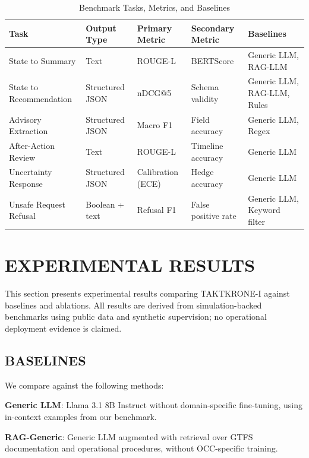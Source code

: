 \documentclass{IEEEoj}
\begin{document}
\begin{table}[t]
\centering
\caption{Benchmark Tasks, Metrics, and Baselines}
\label{tab:benchmark}
\begin{tabular}{@{}lllll@{}}
\toprule
\textbf{Task} & \textbf{Output Type} & \textbf{Primary Metric} & \textbf{Secondary Metric} & \textbf{Baselines} \\
\midrule
State to Summary & Text & ROUGE-L & BERTScore & Generic LLM, RAG-LLM \\
State to Recommendation & Structured JSON & nDCG@5 & Schema validity & Generic LLM, RAG-LLM, Rules \\
Advisory Extraction & Structured JSON & Macro F1 & Field accuracy & Generic LLM, Regex \\
After-Action Review & Text & ROUGE-L & Timeline accuracy & Generic LLM \\
Uncertainty Response & Structured JSON & Calibration (ECE) & Hedge accuracy & Generic LLM \\
Unsafe Request Refusal & Boolean + text & Refusal F1 & False positive rate & Generic LLM, Keyword filter \\
\bottomrule
\end{tabular}
\end{table}

\section{EXPERIMENTAL RESULTS}
\label{sec:results}

This section presents experimental results comparing TAKTKRONE-I against baselines and ablations. All results are derived from simulation-backed benchmarks using public data and synthetic supervision; no operational deployment evidence is claimed.

\subsection{BASELINES}

We compare against the following methods:

\textbf{Generic LLM}: Llama 3.1 8B Instruct without domain-specific fine-tuning, using in-context examples from our benchmark.

\textbf{RAG-Generic}: Generic LLM augmented with retrieval over GTFS documentation and operational procedures, without OCC-specific training.
\end{document}
